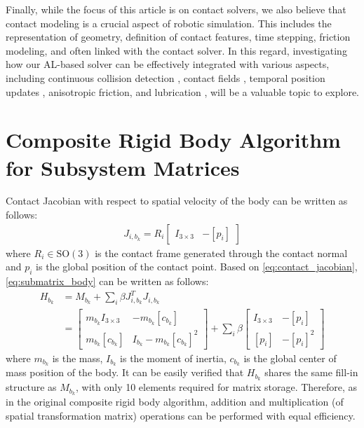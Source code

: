 \documentclass[lettersize,journal]{IEEEtran}
\begin{document}
Finally, while the focus of this article is on contact solvers, we also believe that contact modeling is a crucial aspect of robotic simulation. This includes the representation of geometry, definition of contact features, time stepping, friction modeling, and often linked with the contact solver. In this regard, investigating how our AL-based solver can be effectively integrated with various aspects, including continuous collision detection \cite{li2020incremental}, contact fields \cite{castro2023theory}, temporal position updates \cite{macklin2019small}, anisotropic friction, and lubrication \cite{ludema2018friction}, will be a valuable topic to explore.



\appendices

\section{Composite Rigid Body Algorithm for Subsystem Matrices} \label{appendix:crba}

Contact Jacobian with respect to spatial velocity of the body can be written as follows:
\begin{align} \label{eq:contact_jacobian}
    J_{i,b_k} = 
    R_i\begin{bmatrix}
        I_{3\times 3} & -[p_{i}] 
    \end{bmatrix}
\end{align}
where $R_i\in \mathrm{SO}(3)$ is the contact frame generated through the contact normal and $p_i$ is the global position of the contact point.
Based on \eqref{eq:contact_jacobian}, \eqref{eq:submatrix_body} can be written as follows:
\begin{align*}
H_{b_k} 
&= M_{b_k} + \sum_i \beta J_{i,b_k}^TJ_{i,b_k} \\
&= \begin{bmatrix} 
m_{b_k} I_{3\times 3} & -m_{b_k}[c_{b_k}] \\
    m_{b_k}[c_{b_k}] & I_{b_k}-m_{b_k}[c_{b_k}]^2
\end{bmatrix} 
+ \sum_i \beta \begin{bmatrix}
    I_{3\times 3} & -[p_{i}] \\
    [p_{i}] & - [p_{i}]^2
\end{bmatrix}
\end{align*}
where $m_{b_k}$ is the mass, $I_{b_k}$ is the moment of inertia, $c_{b_k}$ is the global center of mass position of the body.
It can be easily verified that $H_{b_k}$ shares the same fill-in structure as $M_{b_k}$, with only 10 elements required for matrix storage. Therefore, as in the original composite rigid body algorithm, addition and multiplication (of spatial transformation matrix) operations can be performed with equal efficiency.
\end{document}
